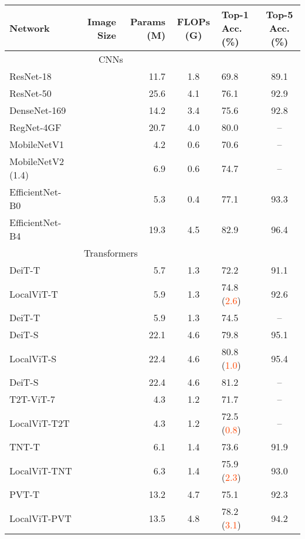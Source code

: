 \documentclass[10pt,twocolumn,letterpaper]{article}
\begin{document}
\begin{table*}[!t]
    \small
    \begin{center}
        \begin{tabular}{l|r|r|c|l|c}
            \toprule
Network & Image Size & Params (M) & FLOPs (G) & Top-1 Acc. (\%) & Top-5 Acc. (\%) \\
             \midrule
             \multicolumn{4}{c}{CNNs} \\ \midrule
             ResNet-18~\cite{he2016deep}   &  & 11.7 & 1.8 & 69.8 & 89.1 \\
             ResNet-50~\cite{he2016deep}   &  & 25.6 & 4.1 & 76.1 & 92.9 \\
             DenseNet-169~\cite{huang2017densely}       &  & 14.2 & 3.4 & 75.6 & 92.8\\
             RegNet-4GF~\cite{radosavovic2020designing} &  & 20.7 & 4.0 & 80.0 & -- \\
             MobileNetV1~\cite{howard2017mobilenets}    &  & 4.2 & 0.6 & 70.6 & -- \\
             MobileNetV2 (1.4)~\cite{sandler2018mobilenetv2} &  & 6.9 & 0.6 & 74.7 & -- \\
             EfficientNet-B0~\cite{tan2019efficientnet} &  & 5.3 & 0.4 & 77.1 & 93.3 \\
             EfficientNet-B4~\cite{tan2019efficientnet} &  & 19.3 & 4.5 & 82.9 & 96.4 \\ \midrule
             \multicolumn{4}{c}{Transformers} \\ \midrule
             DeiT-T~\cite{touvron2020training}  &   &5.7 & 1.3 &72.2 & 91.1\\
             LocalViT-T   &  & 5.9 & 1.3 & 74.8 (\textcolor{OrangeRed}{2.6}) & 92.6 \\
             DeiT-T~\cite{touvron2020training}  &   & 5.9 & 1.3 & 74.5 & --\\ \hline
             DeiT-S~\cite{touvron2020training}  &  & 22.1 & 4.6 &79.8 &95.1\\
             LocalViT-S   &  & 22.4 & 4.6 & 80.8 (\textcolor{OrangeRed}{1.0}) &95.4\\ 
             DeiT-S~\cite{touvron2020training}  &   & 22.4 & 4.6 & 81.2 &--\\  \midrule
             T2T-ViT-7~\cite{yuan2021tokens}    &  & 4.3 & 1.2 & 71.7 & --\\
             LocalViT-T2T &  & 4.3 & 1.2 & 72.5 (\textcolor{OrangeRed}{0.8}) &-- \\ \midrule
             TNT-T~\cite{han2021transformer}    &  & 6.1 & 1.4 & 73.6 & 91.9 \\
             LocalViT-TNT &  & 6.3 & 1.4 & 75.9 (\textcolor{OrangeRed}{2.3}) & 93.0 \\ \midrule
             PVT-T~\cite{wang2021pyramid}       &  & 13.2 & 4.7 & 75.1 & 92.3\\ 
             LocalViT-PVT &  & 13.5 & 4.8 & 78.2 (\textcolor{OrangeRed}{3.1}) & 94.2 \\  \bottomrule
             

\end{tabular}
\end{center}
\end{table*}
\end{document}
